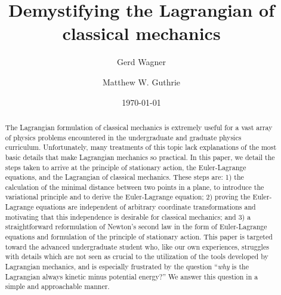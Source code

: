 \documentclass[prb,preprint]{revtex4-1}
\begin{document}

\title{Demystifying the Lagrangian of classical mechanics} %

\author{Gerd Wagner}

\author{Matthew W. Guthrie}


\date{\today}

\begin{abstract} 
The Lagrangian formulation of classical mechanics is extremely useful for a vast array of physics problems encountered in the undergraduate and graduate physics curriculum. Unfortunately, many treatments of this topic lack explanations of the most basic details that make Lagrangian mechanics so practical. In this paper, we detail the steps taken to arrive at the principle of stationary action, the Euler-Lagrange equations, and the Lagrangian of classical mechanics. These steps are: 1) the calculation of the minimal distance between two points in a plane, to introduce the variational principle and to derive the Euler-Lagrange equation; 2) proving the Euler-Lagrange equations are independent of arbitrary coordinate transformations and motivating that this independence is desirable for classical mechanics; and 3) a straightforward reformulation of Newton's second law in the form of Euler-Lagrange equations and formulation of the principle of stationary action. This paper is targeted toward the advanced undergraduate student who, like our own experiences, struggles with details which are not seen as crucial to the utilization of the tools developed by Lagrangian mechanics, and is especially frustrated by the question ``\textit{why} is the Lagrangian always kinetic minus potential energy?'' We answer this question in a simple and approachable manner.
\end{abstract}  
\end{document}
